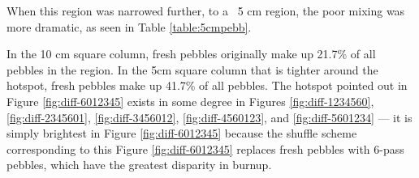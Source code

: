 

When this region was narrowed further, to a ~5 cm region, the poor mixing was more dramatic, as seen in Table \ref{table:5cmpebb}.



In the 10 cm square column, fresh pebbles originally make up 21.7\% of all pebbles in the region.  In the 5cm square column that is tighter around the hotspot, fresh pebbles make up 41.7\% of all pebbles.  The hotspot pointed out in Figure \ref{fig:diff-6012345} exists in some degree in Figures \ref{fig:diff-1234560}, \ref{fig:diff-2345601}, \ref{fig:diff-3456012}, \ref{fig:diff-4560123}, and \ref{fig:diff-5601234} --- it is simply brightest in Figure \ref{fig:diff-6012345} because the shuffle scheme corresponding to this Figure \ref{fig:diff-6012345} replaces fresh pebbles with 6-pass pebbles, which have the greatest disparity in burnup.